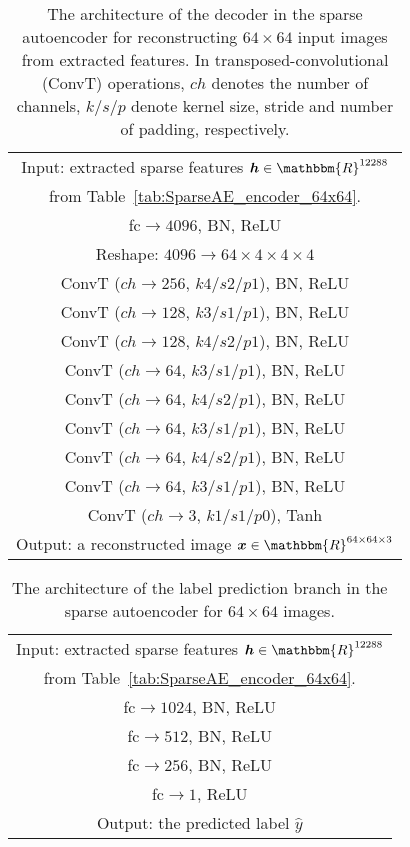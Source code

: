 \documentclass[final,12pt, 3p,times]{elsarticle}
\begin{document}
\begin{table}[h]
	\centering
	\caption{The architecture of the decoder in the sparse autoencoder for reconstructing $64\times64$ input images from extracted features. In transposed-convolutional (ConvT) operations, $ch$ denotes the number of channels, $k/s/p$ denote kernel size, stride and number of padding, respectively. }
\begin{tabular}{c}
			\toprule
			Input: extracted sparse features $\bm{h}\in \mathbbm{R}^{12288}$ 
			\\ from Table~\ref{tab:SparseAE_encoder_64x64}. \\
			\hline
			fc$\rightarrow 4096$, BN, ReLU \\\hline
			Reshape: $4096\rightarrow 64\times 4\times 4 \times 4$\\ \hline
			ConvT ($ch\rightarrow256$, $k4/s2/p1$), BN, ReLU \\\hline
			ConvT ($ch\rightarrow128$, $k3/s1/p1$), BN, ReLU \\\hline
			ConvT ($ch\rightarrow128$, $k4/s2/p1$), BN, ReLU \\\hline
			ConvT ($ch\rightarrow64$, $k3/s1/p1$), BN, ReLU \\\hline
			ConvT ($ch\rightarrow64$, $k4/s2/p1$), BN, ReLU \\\hline
			ConvT ($ch\rightarrow64$, $k3/s1/p1$), BN, ReLU \\\hline
			ConvT ($ch\rightarrow64$, $k4/s2/p1$), BN, ReLU \\\hline
			ConvT ($ch\rightarrow64$, $k3/s1/p1$), BN, ReLU \\\hline
			ConvT ($ch\rightarrow3$, $k1/s1/p0$), Tanh
			\\ \hline
			Output: a reconstructed image $\bm{x}\in \mathbbm{R}^{64\times 64\times 3}$
			\\ \bottomrule
		\end{tabular}\label{tab:SparseAE_decoder_64x64}\end{table}


\begin{table}[h]
	\centering
	\caption{The architecture of the label prediction branch in the sparse autoencoder for $64\times64$ images.}
\begin{tabular}{c}
			\toprule
			Input: extracted sparse features $\bm{h}\in \mathbbm{R}^{12288}$ \\
			from Table~\ref{tab:SparseAE_encoder_64x64}. \\
			\hline
			fc$\rightarrow 1024$, BN, ReLU \\\hline
			fc$\rightarrow 512$, BN, ReLU \\\hline
			fc$\rightarrow 256$, BN, ReLU \\\hline
			fc$\rightarrow 1$, ReLU \\
			\hline
			Output: the predicted label $\hat{y}$
			\\ \bottomrule
		\end{tabular}\label{tab:SparseAE_labelPred_64x64}\end{table}
\end{document}
